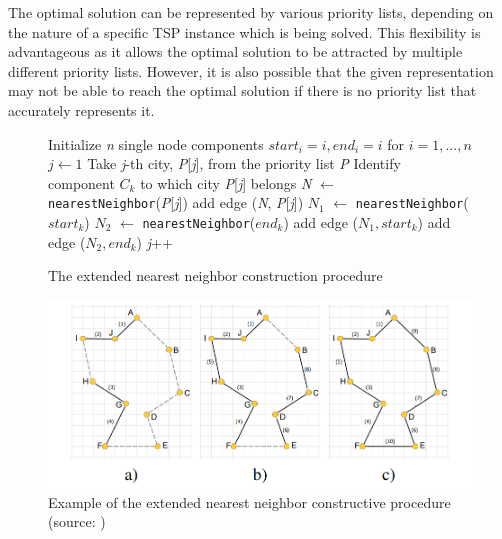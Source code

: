 \documentclass[twoside]{ctuthesis}
\theoremstyle{plain}
\theoremstyle{definition}
\theoremstyle{note}
\begin{document}
The optimal solution can be represented by various priority lists, depending on the nature of a specific TSP instance which is being solved. This flexibility is advantageous as it allows the optimal solution to be attracted by multiple different priority lists. However, it is also possible that the given representation may not be able to reach the optimal solution if there is no priority list that accurately represents it.


\begin{figure}
\begin{algorithmic}[1]
\State Initialize \emph{n} single node components \emph{$ start_i = i, end_i = i $} for \emph{$ i = 1, ..., n $}
\State $j \gets 1$
\Do
\State Take \emph{j}-th city, \emph{P}[\emph{j}], from the priority list \emph{P}
\State Identify component \emph{$ C_k $} to which city \emph{P}[\emph{j}] belongs
\State \emph{N} $\gets$ {\tt nearestNeighbor}(\emph{P}[\emph{j}])
\State add edge (\emph{N}, \emph{P}[\emph{j}])
\Else
\State \emph{$ N_1 $} $\gets$ {\tt nearestNeighbor}(\emph{$ start_k $})
\State \emph{$ N_2 $} $\gets$ {\tt nearestNeighbor}(\emph{$ end_k $})
\State add edge (\emph{$ N_1, start_k $})
\Else
\State add edge (\emph{$ N_2, end_k $})
\EndIf
\EndIf
\State \emph{j}++

\end{algorithmic}
	\caption{The extended nearest neighbor construction procedure}
	\label{fig:cnnptsp}
\end{figure}

\begin{figure}
	\includegraphics[width=\linewidth]{tspexample.png}
	\caption{Example of the extended nearest neighbor constructive
		procedure (source: \cite{kubalik2014novel})}
	\label{fig:tsp}
\end{figure}
\end{document}

